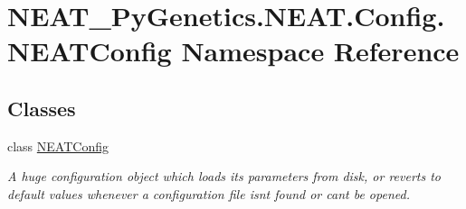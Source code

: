 \hypertarget{namespaceNEAT__PyGenetics_1_1NEAT_1_1Config_1_1NEATConfig}{}\section{N\+E\+A\+T\+\_\+\+Py\+Genetics.\+N\+E\+A\+T.\+Config.\+N\+E\+A\+T\+Config Namespace Reference}
\label{namespaceNEAT__PyGenetics_1_1NEAT_1_1Config_1_1NEATConfig}
\subsection*{Classes}
\begin{DoxyCompactItemize}
\item 
class \hyperlink{classNEAT__PyGenetics_1_1NEAT_1_1Config_1_1NEATConfig_1_1NEATConfig}{N\+E\+A\+T\+Config}
\begin{DoxyCompactList}\small\item\em A huge configuration object which loads it\textquotesingle{}s parameters from disk, or reverts to default values whenever a configuration file isn\textquotesingle{}t found or can\textquotesingle{}t be opened. \end{DoxyCompactList}\end{DoxyCompactItemize}
